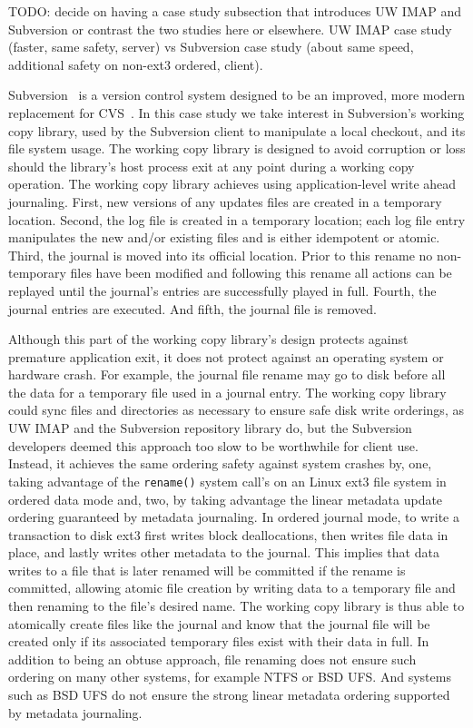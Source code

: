 TODO: decide on having a case study subsection that introduces UW IMAP
and Subversion or contrast the two studies here or elsewhere.
%
UW IMAP case study (faster, same safety, server) vs
Subversion case study (about same speed, additional safety on non-ext3
ordered, client).

Subversion~\cite{svn} is a version control system designed to be an
improved, more modern replacement for CVS~\cite{cvs}. In this case
study we take interest in Subversion's working copy library, used by
the Subversion client to manipulate a local checkout, and its file
system usage.
%
The working copy library is designed to avoid corruption or loss
should the library's host process exit at any point during a working
copy operation. The working copy library achieves using
application-level write ahead journaling.
%
First, new versions of any updates files are created in a temporary
location. Second, the log file is created in a temporary location;
each log file entry manipulates the new and/or existing files and is
either idempotent or atomic. Third, the journal is moved into its
official location. Prior to this rename no non-temporary files have
been modified and following this rename all actions can be replayed
until the journal's entries are successfully played in full. Fourth,
the journal entries are executed.  And fifth, the journal file is
removed.

Although this part of the working copy library's design protects
against premature application exit, it does not protect against an
operating system or hardware crash. For example, the journal file
rename may go to disk before all the data for a temporary file used in
a journal entry.
%
The working copy library could sync files and directories as necessary
to ensure safe disk write orderings, as UW IMAP and the Subversion
repository library do, but the Subversion developers deemed this
approach too slow to be worthwhile for client use.
%
Instead, it achieves the same ordering safety against system crashes
by,
%
one, taking advantage of the \texttt{rename()} system call's on an
Linux ext3 file system in ordered data mode and,
%
two, by taking advantage the linear metadata update ordering
guaranteed by metadata journaling.
%
In ordered journal mode, to write a transaction to disk ext3 first
writes block deallocations, then writes
file data in place, and lastly writes other metadata to the journal.
This implies that data writes to a file that is later renamed will be
committed if the rename is committed, allowing atomic file creation by
writing data to a temporary file and then renaming to the file's
desired name.
%
The working copy library is thus able to atomically create files like the
journal and know that the journal file will be created only if its
associated temporary files exist with their data in full.
%
In addition to being an obtuse approach, file renaming does not
ensure such ordering on many other systems, for example NTFS or BSD UFS.
And systems such as BSD UFS do not ensure the strong linear metadata
ordering supported by metadata journaling.
%

